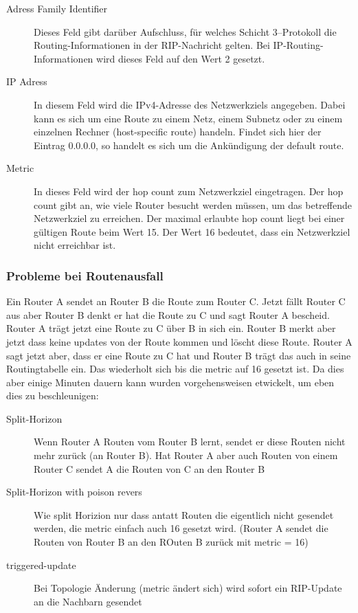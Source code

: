 \documentclass[a4paper,10pt]{scrartcl}
\begin{document}
                    \begin{description}
                        \item[Adress Family Identifier] 
                            Dieses Feld  gibt darüber Aufschluss, für welches Schicht 3–Protokoll die Routing-Informationen in der RIP-Nachricht gelten.
                            Bei IP-Routing-Informationen wird dieses Feld auf den Wert 2 gesetzt. 
                        \item[IP Adress]  In diesem Feld wird die IPv4-Adresse des Netzwerkziels angegeben. Dabei
                            kann es sich um eine Route zu einem Netz, einem Subnetz oder zu einem
                            einzelnen Rechner (host-specific route) handeln. Findet sich hier der
                            Eintrag 0.0.0.0, so handelt es sich um die Ankündigung der default route.
                        \item[Metric] In dieses Feld wird der hop count zum Netzwerkziel eingetragen. Der hop
                            count gibt an, wie viele Router besucht werden müssen, um das betreffende
                            Netzwerkziel zu erreichen. Der maximal erlaubte hop count liegt bei einer
                            gültigen Route beim Wert 15. Der Wert 16 bedeutet, dass ein Netzwerkziel
                            nicht erreichbar ist.
                    \end{description}
                \subsubsection*{Probleme bei Routenausfall}
                    Ein Router A sendet an Router B die Route zum Router C. Jetzt fällt Router C aus aber Router B denkt er hat die Route zu C und sagt Router A bescheid. 
                    Router A trägt jetzt eine Route zu C über B in sich ein. Router B merkt aber jetzt dass keine updates von der Route kommen und löscht diese Route. Router A
                    sagt jetzt aber, dass er eine Route zu C hat und Router B trägt das auch in seine Routingtabelle ein. Das wiederholt sich bis die metric auf 16 gesetzt ist. Da dies
                    aber einige Minuten dauern kann wurden vorgehensweisen etwickelt, um eben dies zu beschleunigen:
                    \begin{description}
                        \item[Split-Horizon] 
                            Wenn Router A Routen vom Router B lernt, sendet er diese Routen nicht mehr zurück (an Router B).
                            Hat Router A aber auch Routen von einem Router C sendet A die Routen von C an den Router B 
                        \item[Split-Horizon with poison revers] Wie split Horizion nur dass antatt Routen die eigentlich nicht gesendet werden, die metric einfach auch 16 gesetzt wird. 
                            (Router A sendet die Routen von Router B an den ROuten B zurück mit metric = 16)
                        \item[triggered-update] 
                            Bei Topologie Änderung (metric ändert sich) wird sofort ein RIP-Update an die Nachbarn gesendet
                    \end{description}
            
\end{document}
